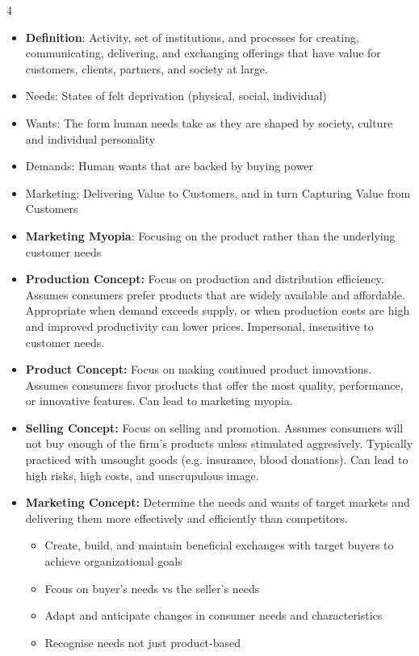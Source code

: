 \documentclass[10pt, landscape]{article}
\begin{document}
\begin{multicols*}{4}
  \begin{itemize}
    \item \textbf{Definition}: Activity, set of institutions, and processes for creating, communicating, delivering, and exchanging offerings that have value for customers, clients, partners, and society at large.
    \item Needs: States of felt deprivation (physical, social, individual)
    \item Wants: The form human needs take as they are shaped by society, culture and individual personality
    \item Demands: Human wants that are backed by buying power
    \item Marketing: Delivering Value to Customers, and in turn Capturing Value from Customers
    \item \textbf{Marketing Myopia}: Focusing on the product rather than the underlying customer needs
    \item \textbf{Production Concept:} Focus on production and distribution efficiency. Assumes consumers prefer products that are widely available and affordable. Appropriate when demand exceeds supply, or when production costs are high and improved productivity can lower prices. Impersonal, insensitive to customer needs.
    \item \textbf{Product Concept:} Focus on making continued product innovations. Assumes consumers favor products that offer the most quality, performance, or innovative features. Can lead to marketing myopia.
    \item \textbf{Selling Concept:} Focus on selling and promotion. Assumes consumers will not buy enough of the firm's products unless stimulated aggresively. Typically practiced with unsought goods (e.g. insurance, blood donations). Can lead to high risks, high costs, and unscrupulous image.
    \item \textbf{Marketing Concept:} Determine the needs and wants of target markets and delivering them more effectively and efficiently than competitors. 
      \begin{itemize}
        \item Create, build, and maintain beneficial exchanges with target buyers to achieve organizational goals
        \item Fcous on buyer's needs vs the seller's needs
        \item Adapt and anticipate changes in consumer needs and characteristics
        \item Recognise needs not just product-based

\end{itemize}
\end{itemize}
\end{multicols*}
\end{document}
